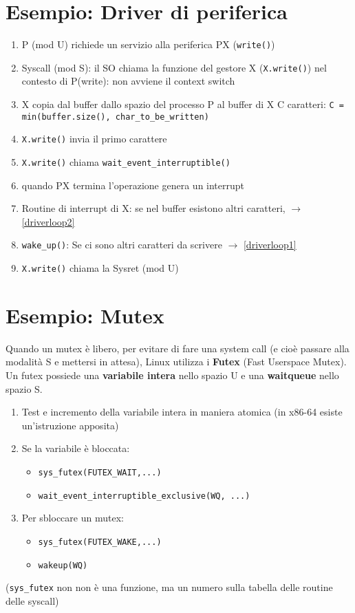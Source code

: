 \documentclass[12pt, a4paper]{report}
\begin{document}
\section{Esempio: Driver di periferica}
\begin{enumerate}
	\item P (mod U) richiede un servizio alla periferica PX
		(\texttt{write()})
	\item Syscall (mod S): il SO chiama la funzione del gestore X
		(\texttt{X.write()}) nel contesto di P(write): non avviene il
		context switch
	\item \label{driverloop1} X copia dal buffer dallo spazio del processo
		P al buffer di X C caratteri: \texttt{C = min(buffer.size(),
		char\_to\_be\_written)}
	\item \label{driverloop2} \texttt{X.write()} invia il primo carattere
	\item \texttt{X.write()} chiama \texttt{wait\_event\_interruptible()}
	\item quando PX termina l'operazione genera un interrupt
	\item Routine di interrupt di X: se nel buffer esistono altri caratteri,
		$\to$ \ref{driverloop2}
	\item \texttt{wake\_up()}: Se ci sono altri caratteri da scrivere $\to$
		\ref{driverloop1}
	\item \texttt{X.write()} chiama la Sysret (mod U)
\end{enumerate}

\section{Esempio: Mutex}
Quando un mutex è libero, per evitare di fare una system call (e cioè passare
alla modalità S e mettersi in attesa), Linux utilizza i \textbf{Futex}
(Fast Userspace Mutex). Un futex possiede una \textbf{variabile intera} nello
spazio U e una \textbf{waitqueue} nello spazio S.
\begin{enumerate}
	\item Test e incremento della variabile intera in maniera atomica (in x86-64
		esiste un'istruzione  apposita)
	\item Se la variabile è bloccata:
		\begin{itemize}
			\item \texttt{sys\_futex(FUTEX\_WAIT,...)}
			\item \texttt{wait\_event\_interruptible\_exclusive(WQ, ...)}
		\end{itemize}
	\item Per sbloccare un mutex:
		\begin{itemize}
			\item \texttt{sys\_futex(FUTEX\_WAKE,...)}
			\item \texttt{wakeup(WQ)}
		\end{itemize}
\end{enumerate}
(\texttt{sys\_futex} non non è una funzione, ma un numero sulla tabella delle
routine delle syscall)
\end{document}

